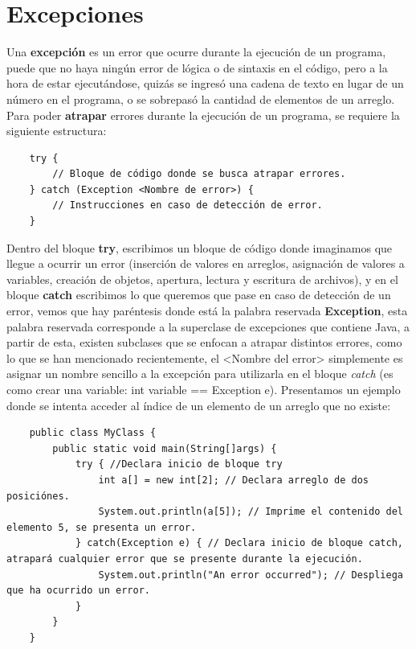 \section{Excepciones}
\hspace{0.55cm}Una \textbf{excepción} es un error que ocurre durante la ejecución de un programa, puede que no haya ningún error de lógica o de sintaxis en el código, pero a la hora de estar ejecutándose, quizás se ingresó una cadena de texto en lugar de un número en el programa, o se sobrepasó la cantidad de elementos de un arreglo. Para poder \textbf{atrapar} errores durante la ejecución de un programa, se requiere la siguiente estructura:
\begin{lstlisting}
    try {
        // Bloque de código donde se busca atrapar errores.
    } catch (Exception <Nombre de error>) {
        // Instrucciones en caso de detección de error.
    }
\end{lstlisting}

Dentro del bloque \textbf{try}, escribimos un bloque de código donde imaginamos que llegue a ocurrir un error (inserción de valores en arreglos, asignación de valores a variables, creación de objetos, apertura, lectura y escritura de archivos), y en el bloque \textbf{catch} escribimos lo que queremos que pase en caso de detección de un error, vemos que hay paréntesis donde está la palabra reservada \textbf{Exception}, esta palabra reservada corresponde a la superclase de excepciones que contiene Java, a partir de esta, existen subclases que se enfocan a atrapar distintos errores, como lo que se han mencionado recientemente, el <Nombre del error> simplemente es asignar un nombre sencillo a la excepción para utilizarla en el bloque \textit{catch} (es como crear una variable: int variable == Exception e). Presentamos un ejemplo donde se intenta acceder al índice de un elemento de un arreglo que no existe:
\begin{lstlisting}
    public class MyClass {
        public static void main(String[]args) {
            try { //Declara inicio de bloque try
                int a[] = new int[2]; // Declara arreglo de dos posiciónes.
                System.out.println(a[5]); // Imprime el contenido del elemento 5, se presenta un error.
            } catch(Exception e) { // Declara inicio de bloque catch, atrapará cualquier error que se presente durante la ejecución.
                System.out.println("An error occurred"); // Despliega que ha ocurrido un error.
            }
        }
    }
\end{lstlisting}


